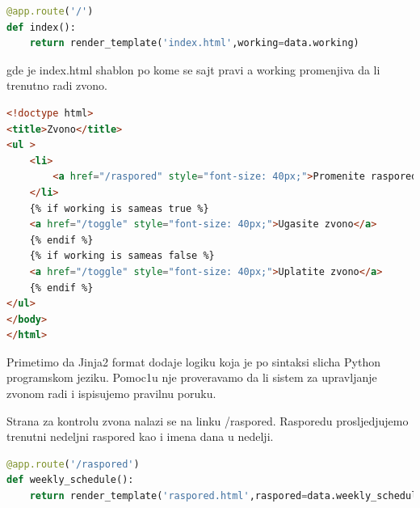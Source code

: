 \documentclass[a4paper,fleqn,12pt]{JMThesis}
\newcommand{\latin}{\fontencoding{T1}\selectfont}
\theoremstyle{plain}
\theoremstyle{definition}
\begin{document}
{\latin
\begin{center}
\begin{lstlisting}[language=Python,caption=Pochetna strana]
@app.route('/')
def index():
    return render_template('index.html',working=data.working)
\end{lstlisting}
\end{center}
}

gde je {\latin index.html} shablon po kome se sajt pravi a {\latin working} promenjiva da li trenutno radi zvono.

{\latin
\begin{center}
\begin{lstlisting}[language=HTML,caption={\latin index.html}]
<!doctype html>
<title>Zvono</title>
<ul >
    <li>
        <a href="/raspored" style="font-size: 40px;">Promenite raspored</a>
    </li>
    {% if working is sameas true %}
    <a href="/toggle" style="font-size: 40px;">Ugasite zvono</a>
    {% endif %}
    {% if working is sameas false %}
    <a href="/toggle" style="font-size: 40px;">Uplatite zvono</a>
    {% endif %}
</ul>
</body>
</html>
\end{lstlisting}
\end{center}
}
Primetimo da {\latin Jinja2} format dodaje logiku koja je po sintaksi slicha {\latin Python} programskom jeziku. Pomoc1u nje proveravamo da li sistem za upravljanje zvonom radi i ispisujemo pravilnu poruku.

Strana za kontrolu zvona nalazi se na linku {\latin /raspored}. Rasporedu prosljedjujemo trenutni nedeljni raspored kao i imena dana u nedelji.
{\latin
\begin{center}
\begin{lstlisting}[language=Python]
@app.route('/raspored')
def weekly_schedule():
    return render_template('raspored.html',raspored=data.weekly_schedule,diw=data.days_in_week)
\end{lstlisting}
\end{center}
}
\end{document}
